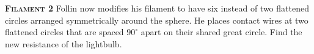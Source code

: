\begin{problem}{\textbf{\textsc{Filament 2}}\hspace{1mm}}
Follin now modifies his filament to have six instead of two flattened circles arranged symmetrically around the sphere. He places contact wires at two flattened circles that are spaced $90^\circ$ apart on their shared great circle. Find the new resistance of the lightbulb.
\end{problem}